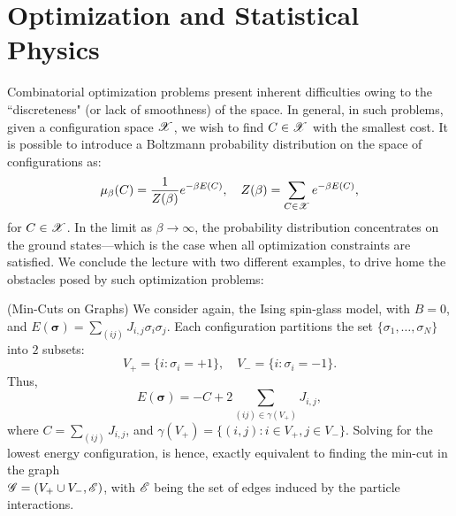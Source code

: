 \documentclass[letterpaper,english,10pt]{article}
\begin{document}
\section{Optimization and Statistical Physics}
Combinatorial optimization problems present inherent difficulties owing to the ``discreteness" (or lack of smoothness) of the space. In general, in such problems, given a configuration space $\mathscr{X}$, we wish to find $C\in \mathscr{X}$ with the smallest cost.
It is possible to introduce a Boltzmann probability distribution on the space of configurations as:
\begin{equation*}
    \mu_{\beta}(C) = \frac{1}{Z(\beta)}e^{-\beta E(C)},\quad Z(\beta) = \sum_{C\in \mathscr{X}}e^{-\beta E(C)},
\end{equation*}
for $C\in \mathscr{X}$. In the limit as $\beta\rightarrow \infty$, the probability distribution concentrates on the ground states---which is the case when all optimization constraints are satisfied.
We conclude the lecture with two different examples, to drive home the obstacles posed by such optimization problems:
\begin{shaded*}
\begin{exmp}(Min-Cuts on Graphs)
We consider again, the Ising spin-glass model, with $B=0$, and $E(\bm{\sigma})=\sum_{(ij)}J_{i,j}\sigma_i\sigma_j$.
Each configuration partitions the set $\{\sigma_1,\ldots,\sigma_N\}$ into $2$ subsets:
\begin{equation*}
    V_{+} = \{i:\sigma_i=+1\},\quad V_{-} = \{i:\sigma_i=-1\}.
\end{equation*}
Thus,
\begin{equation*}
    E(\bm{\sigma})=-C+2\sum_{(ij)\in \gamma(V_{+})}J_{i,j},
\end{equation*}
where $C=\sum_{(ij)}J_{i,j}$, and $\gamma(V_{+})=\{(i,j):i\in V_{+},j\in V_{-}\}$.
Solving for the lowest energy configuration, is hence, exactly equivalent to finding the min-cut in the graph \\$\mathscr{G}=(V_{+}\cup V_{-},\mathscr{E})$, with $\mathscr{E}$ being the set of edges induced by the particle interactions.
\end{exmp}
\end{shaded*}
\end{document}
